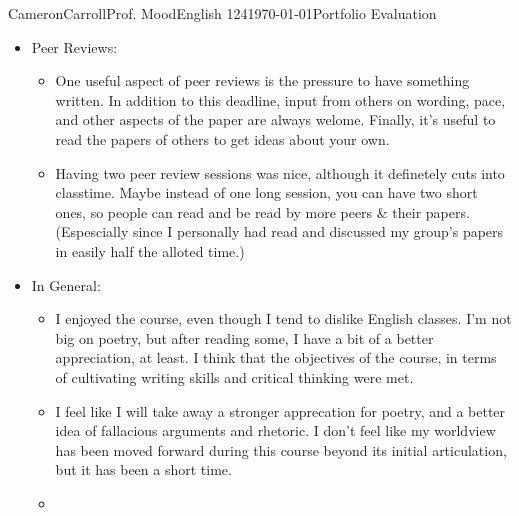 \documentclass[12pt,letterpaper]{article}
\begin{document}
\begin{mla}{Cameron}{Carroll}{Prof. Mood}{English 124}{\today}{Portfolio Evaluation}
\begin{itemize}
\item Peer Reviews: 
	\begin{itemize}
	\item One useful aspect of peer reviews is the pressure to have something written. In addition to this deadline, input from others on wording, pace, and other aspects of the paper are always welome. Finally, it's useful to read the papers of others to get ideas about your own.
	\item Having two peer review sessions was nice, although it definetely cuts into classtime. Maybe instead of one long session, you can have two short ones, so people can read and be read by more peers \& their papers. (Espescially since I personally had read and discussed my group's papers in easily half the alloted time.)
	\end{itemize}

\item In General: 
	\begin{itemize}
	\item I enjoyed the course, even though I tend to dislike English classes. I'm not big on poetry, but after reading some, I have a bit of a better appreciation, at least. I think that the objectives of the course, in terms of cultivating writing skills and critical thinking were met.
	\item I feel like I will take away a stronger apprecation for poetry, and a better idea of fallacious arguments and rhetoric. I don't feel like my worldview has been moved forward during this course beyond its initial articulation, but it has been a short time.
	\item 
	\end{itemize}
\end{itemize}

\end{mla}
\end{document}
